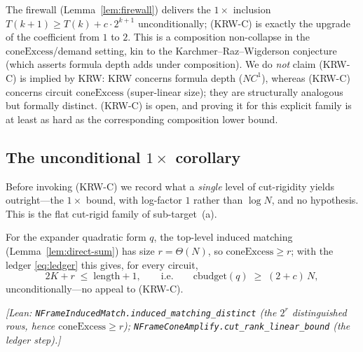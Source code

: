 \begin{remark}[On (KRW-C)]
The firewall (Lemma~\ref{lem:firewall}) delivers the $1\times$ inclusion
$T(k+1)\ge T(k)+c\cdot 2^{k+1}$ unconditionally; (KRW-C) is exactly the upgrade of
the coefficient from $1$ to $2$.  This is a composition non-collapse in the
$\mathrm{coneExcess}$/demand setting, kin to the Karchmer--Raz--Wigderson
conjecture (which asserts formula depth adds under composition).  We do
\emph{not} claim (KRW-C) is implied by KRW: KRW concerns formula depth ($NC^1$),
whereas (KRW-C) concerns circuit $\mathrm{coneExcess}$ (super-linear size); they
are structurally analogous but formally distinct.  (KRW-C) is open, and proving
it for this explicit family is at least as hard as the corresponding composition
lower bound.
\end{remark}

\subsection{The unconditional \texorpdfstring{$1\times$}{1x} corollary}
\label{ss:unconditional}

Before invoking (KRW-C) we record what a \emph{single} level of cut-rigidity yields
outright---the $1\times$ bound, with log-factor $1$ rather than $\log N$, and no
hypothesis.  This is the flat cut-rigid family of sub-target~(a).

\begin{corollary}
\label{cor:unconditional-linear}
For the expander quadratic form $q$, the top-level induced matching
(Lemma~\ref{lem:direct-sum}) has size $r=\Theta(N)$, so
$\mathrm{coneExcess}\ge r$; with the ledger \eqref{eq:ledger} this gives, for
every circuit,
\[
  2K + r \;\le\; \mathrm{length}+1,
  \qquad\text{i.e.}\qquad
  \mathrm{cbudget}(q)\;\ge\;(2+c)\,N ,
\]
unconditionally---no appeal to \textup{(KRW-C)}.
\end{corollary}
\noindent\emph{[Lean: \texttt{NFrameInducedMatch.induced\_matching\_distinct}
(the $2^{r}$ distinguished rows, hence $\mathrm{coneExcess}\ge r$);
\texttt{NFrameConeAmplify.cut\_rank\_linear\_bound} (the ledger step).]}

